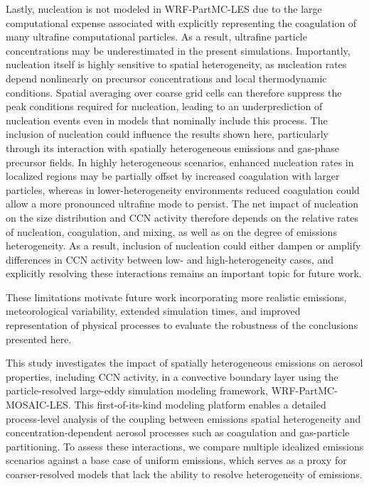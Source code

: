 \documentclass[acp]{copernicus}
\begin{document}
Lastly, nucleation is not modeled in WRF-PartMC-LES due to the large computational expense associated with explicitly representing the coagulation of many ultrafine computational particles. As a result, ultrafine particle concentrations may be
  underestimated in the present simulations. Importantly, nucleation
  itself is highly sensitive to spatial heterogeneity, as nucleation
  rates depend nonlinearly on precursor concentrations and local
  thermodynamic conditions. Spatial averaging over coarse grid cells
  can therefore suppress the peak conditions required for nucleation,
  leading to an underprediction of nucleation events even in models
  that nominally include this process. The inclusion of nucleation
  could influence the results shown here, particularly through its
  interaction with spatially heterogeneous emissions and gas-phase
  precursor fields. In highly heterogeneous scenarios, enhanced
  nucleation rates in localized regions may be partially offset by
  increased coagulation with larger particles, whereas in
  lower-heterogeneity environments reduced coagulation could allow a
  more pronounced ultrafine mode to persist. The net impact of
  nucleation on the size distribution and CCN activity therefore
  depends on the relative rates of nucleation, coagulation, and
  mixing, as well as on the degree of emissions heterogeneity. As a
  result, inclusion of nucleation could either dampen or amplify
  differences in CCN activity between low- and high-heterogeneity
  cases, and explicitly resolving these interactions remains an
  important topic for future work.
  
These limitations motivate future work incorporating more realistic
emissions, meteorological variability, extended simulation times, and improved representation of physical processes to evaluate the robustness of the conclusions presented here.


\conclusions  %

This study investigates the impact of spatially heterogeneous
emissions on aerosol properties, including CCN activity, in a
convective boundary layer using the particle-resolved large-eddy
simulation modeling framework, WRF-PartMC-MOSAIC-LES. This
first-of-its-kind modeling platform enables a detailed process-level
analysis of the coupling between emissions spatial heterogeneity and
concentration-dependent aerosol processes such as coagulation and
gas-particle partitioning. To assess these interactions, we compare
multiple idealized emissions scenarios against a base case of uniform
emissions, which serves as a proxy for coarser-resolved models that
lack the ability to resolve heterogeneity of emissions.
\end{document}
